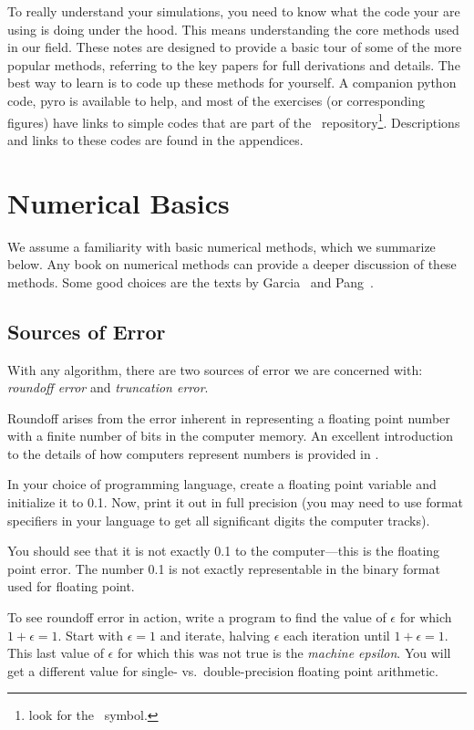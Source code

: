 To really understand your simulations, you need to know what the code
your are using is doing under the hood.  This means understanding the
core methods used in our field.  These notes are designed to provide a
basic tour of some of the more popular methods, referring to the key
papers for full derivations and details.  The best way to learn is to
code up these methods for yourself.  A companion python code, {\sf
  pyro} is available to help, and most of the exercises (or
corresponding figures) have links to simple codes that are part of the \hydroex\
repository\footnote{look for the \hydroexsymb\ symbol.}. Descriptions
and links to these codes are found in the appendices.


\section{Numerical Basics}

We assume a familiarity with basic numerical methods, which we
summarize below.  Any book on numerical methods can provide a
deeper discussion of these methods.  Some good choices are the
texts by Garcia~\cite{garcia} and Pang~\cite{pang}.

\subsection{Sources of Error}

With any algorithm, there are two sources of error we are concerned
with: {\em roundoff error} and {\em truncation error}.

Roundoff arises from the error inherent in representing a floating
point number with a finite number of bits in the computer memory.  An
excellent introduction to the details of how computers represent
numbers is provided in \cite{goldberg:1991}.

\begin{exercise}
In your choice of programming language, create a floating point
variable and initialize it to 0.1.  Now, print it out in full
precision (you may need to use format specifiers in your language to
get all significant digits the computer tracks).  

You should see that it is not exactly 0.1 to the computer---this is
the floating point error.  The number 0.1 is not exactly representable
in the binary format used for floating point.
\end{exercise}


\begin{exercise}
To see roundoff error in action, write a program to find the value of
$\epsilon$ for which $1 + \epsilon = 1$.  Start with $\epsilon = 1$
and iterate, halving $\epsilon$ each iteration until $1 + \epsilon =
1$. This last value of $\epsilon$ for which this was not true is
the {\em machine epsilon}.  You will get a different value for
single- vs.\ double-precision floating point arithmetic.
\end{exercise}

